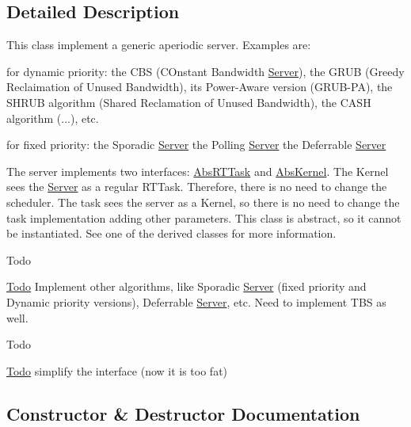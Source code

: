 \subsection{Detailed Description}
This class implement a generic aperiodic server. Examples are\+:
\begin{DoxyItemize}
\item for dynamic priority\+: the C\+BS (C\+Onstant Bandwidth \hyperlink{classRTSim_1_1Server}{Server}), the G\+R\+UB (Greedy Reclaimation of Unused Bandwidth), its Power-\/\+Aware version (G\+R\+U\+B-\/\+PA), the S\+H\+R\+UB algorithm (Shared Reclamation of Unused Bandwidth), the C\+A\+SH algorithm (...), etc.
\item for fixed priority\+: the Sporadic \hyperlink{classRTSim_1_1Server}{Server} the Polling \hyperlink{classRTSim_1_1Server}{Server} the Deferrable \hyperlink{classRTSim_1_1Server}{Server}
\end{DoxyItemize}

The server implements two interfaces\+: \hyperlink{classRTSim_1_1AbsRTTask}{Abs\+R\+T\+Task} and \hyperlink{classRTSim_1_1AbsKernel}{Abs\+Kernel}. The Kernel sees the \hyperlink{classRTSim_1_1Server}{Server} as a regular R\+T\+Task. Therefore, there is no need to change the scheduler. The task sees the server as a Kernel, so there is no need to change the task implementation adding other parameters. This class is abstract, so it cannot be instantiated. See one of the derived classes for more information.

\begin{DoxyRefDesc}{Todo}
\item[\hyperlink{todo__todo000012}{Todo}]Implement other algorithms, like Sporadic \hyperlink{classRTSim_1_1Server}{Server} (fixed priority and Dynamic priority versions), Deferrable \hyperlink{classRTSim_1_1Server}{Server}, etc. Need to implement T\+BS as well.\end{DoxyRefDesc}


\begin{DoxyRefDesc}{Todo}
\item[\hyperlink{todo__todo000013}{Todo}]simplify the interface (now it is too fat) \end{DoxyRefDesc}


\subsection{Constructor \& Destructor Documentation}

